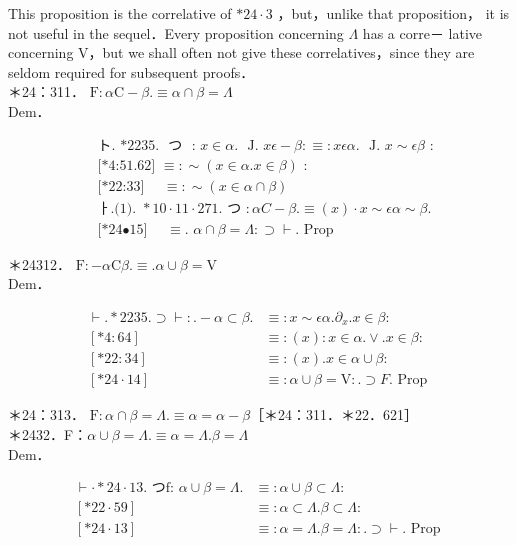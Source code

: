 \documentclass[10pt]{article}
\begin{document}
This proposition is the correlative of $* 24 \cdot 3$ ，but，unlike that proposition， it is not useful in the sequel．Every proposition concerning $\Lambda$ has a corre－ lative concerning V，but we shall often not give these correlatives，since they are seldom required for subsequent proofs．\\
＊24：311． $\mathrm{F}: \alpha \mathrm{C}-\beta . \equiv \alpha \cap \beta=\Lambda$\\
Dem．


\begin{align*}
& \text { ト. *2235. } \text { つ } \text { : } x \in \alpha \text {. } \text { J. } x \epsilon-\beta: \equiv: x \epsilon \alpha \text {. } \text { J. } x \sim \epsilon \beta \text { : } \\
& \text { [*4:51.62] } \equiv: \sim(x \in \alpha . x \in \beta) \text { : } \\
& \text { [*22:33] } \quad \equiv: \sim(x \in \alpha \cap \beta)  \tag{1}\\
& \text { ㅏ.(1). } * 10 \cdot 11 \cdot 271 . \text { つ }: \alpha C-\beta . \equiv(x) \cdot x \sim \epsilon \alpha \sim \beta \text {. } \\
& \text { [*24•15] } \quad \equiv \text {. } \alpha \cap \beta=\Lambda: \supset \vdash \text {. Prop }
\end{align*}


＊24312． $\mathrm{F}:-\alpha \mathrm{C} \beta . \equiv . \alpha \cup \beta=\mathrm{V}$\\
Dem．

$$
\begin{array}{lrl}
\vdash . * 2235 . \supset \vdash: .-\alpha \subset \beta . & \equiv: x \sim \epsilon \alpha . \partial_{x} . x \in \beta: \\
{[* 4: 64]} & \equiv:(x): x \in \alpha . \vee . x \in \beta: \\
{[* 22: 34]} & \equiv:(x) . x \in \alpha \cup \beta: \\
{[* 24 \cdot 14]} & \equiv: \alpha \cup \beta=\mathrm{V}: . \supset F . \text { Prop }
\end{array}
$$

＊24：313． $\mathrm{F}: \alpha \cap \beta=\Lambda . \equiv \alpha=\alpha-\beta$［＊24：311．＊22．621］\\
＊2432．F：$\alpha \cup \beta=\Lambda . \equiv \alpha=\Lambda . \beta=\Lambda$\\
Dem．

$$
\begin{aligned}
\vdash \cdot * 24 \cdot 13 . \text { つf: } \alpha \cup \beta=\Lambda . & \equiv: \alpha \cup \beta \subset \Lambda: \\
{[* 22 \cdot 59] } & \equiv: \alpha \subset \Lambda . \beta \subset \Lambda: \\
{[* 24 \cdot 13] } & \equiv: \alpha=\Lambda . \beta=\Lambda: . \supset \vdash . \text { Prop }
\end{aligned}
$$
\end{document}
